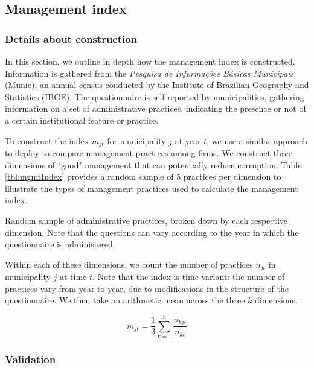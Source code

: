 {\subsection{Management index} \label{app:mgmt}

\subsubsection*{Details about construction}

In this section, we outline in depth how the management index is constructed. Information is gathered from the \textit{Pesquisa de Informações Básicas Municipais} (Munic), an annual census conducted by the Institute of Brazilian Geography and Statistics (IBGE). The questionnaire is self-reported by municipalities, gathering information on a set of administrative practices, indicating the presence or not of a certain institutional feature or practice.

To construct the index $m_{jt}$ for municipality $j$ at year $t$, we use a similar approach to \cite{Bloom2007} deploy to compare management practices among firms. We construct three dimensions of "good" management that can potentially reduce corruption. Table \ref{tbl:mgmtIndex} provides a random sample of 5 practices per dimension to illustrate the types of management practices used to calculate the management index.

\begin{table}[H]
	
	\caption{Random sample of administrative practices, broken down by each respective dimension. Note that the questions can vary according to the year in which the questionnaire is administered.}
	\label{tbl:mgmtIndex}
\end{table}

Within each of these dimensions, we count the number of practices $n_{jt}$  in municipality $j$ at time $t$. Note that the index is time variant: the number of practices vary from year to year, due to modifications in the structure of the questionnaire. We then take an arithmetic mean across the three $k$ dimensions.

$$m_{jt} = \frac{1}{3} \sum_{k = 1}^{3} \frac{n_{kjt}}{n_{kt}}$$

\subsubsection*{Validation}

}
